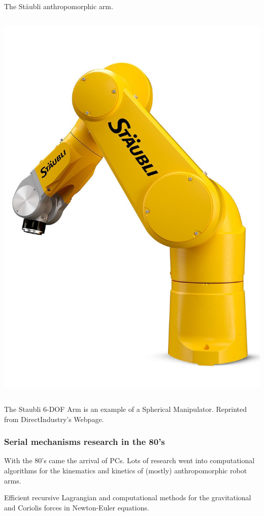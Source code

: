 \begin{frame}
	\begin{block}{The St{\"a}ubli anthropomorphic arm.}
		\begin{columns}[t]
			\begin{column}{10cm}
				\centering
				\includegraphics[scale=.1, width=.5\textwidth, rotate=0]{../Notes/figures/Staubli.jpg}
			\end{column}
		\end{columns}
		\footnotesize{The Staubli 6-DOF Arm is an example of a Spherical Manipulator. Reprinted from DirectIndustry's Webpage.}
	\end{block}
\end{frame}

\begin{frame}
\frametitle{Serial mechanisms research in the 80's}
%
\begin{tcolorbox}[toggle enlargement=none]
With the 80's came the arrival of PCs. Lots of research went into computational algorithms for the kinematics and kinetics of (mostly) anthropomorphic robot arms.
\end{tcolorbox}
\begin{tcolorbox}[coltitle=magenta!70,colframe=blue!80!red,title=Active control schemes,toggle enlargement=forced]
Efficient recursive Lagrangian and computational methods for the gravitational and Coriolis forces in Newton-Euler equations.
\end{tcolorbox}
\end{frame}

